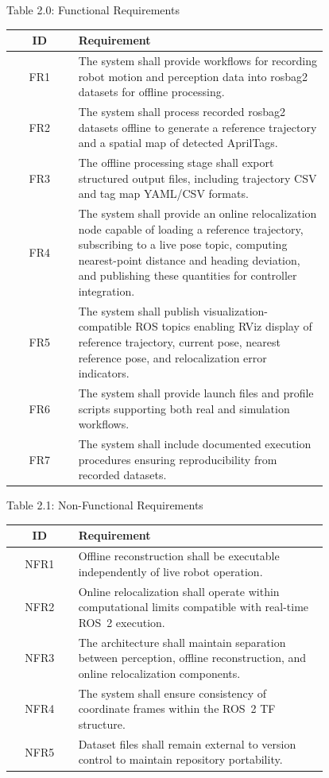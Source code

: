 \begin{frame}[label=appendix-table-20]{Table 2.0: Functional Requirements}
\scriptsize
\centering
\begin{tabular}{|c|p{0.79\linewidth}|}
\hline
\textbf{ID} & \textbf{Requirement} \\ \hline
FR1 & The system shall provide workflows for recording robot motion and perception data into rosbag2 datasets for offline processing. \\ \hline
FR2 & The system shall process recorded rosbag2 datasets offline to generate a reference trajectory and a spatial map of detected AprilTags. \\ \hline
FR3 & The offline processing stage shall export structured output files, including trajectory CSV and tag map YAML/CSV formats. \\ \hline
FR4 & The system shall provide an online relocalization node capable of loading a reference trajectory, subscribing to a live pose topic, computing nearest-point distance and heading deviation, and publishing these quantities for controller integration. \\ \hline
FR5 & The system shall publish visualization-compatible ROS topics enabling RViz display of reference trajectory, current pose, nearest reference pose, and relocalization error indicators. \\ \hline
FR6 & The system shall provide launch files and profile scripts supporting both real and simulation workflows. \\ \hline
FR7 & The system shall include documented execution procedures ensuring reproducibility from recorded datasets. \\ \hline
\end{tabular}
\end{frame}

\begin{frame}[label=appendix-table-21]{Table 2.1: Non-Functional Requirements}
\scriptsize
\centering
\begin{tabular}{|c|p{0.79\linewidth}|}
\hline
\textbf{ID} & \textbf{Requirement} \\ \hline
NFR1 & Offline reconstruction shall be executable independently of live robot operation. \\ \hline
NFR2 & Online relocalization shall operate within computational limits compatible with real-time ROS~2 execution. \\ \hline
NFR3 & The architecture shall maintain separation between perception, offline reconstruction, and online relocalization components. \\ \hline
NFR4 & The system shall ensure consistency of coordinate frames within the ROS~2 TF structure. \\ \hline
NFR5 & Dataset files shall remain external to version control to maintain repository portability. \\ \hline
\end{tabular}
\end{frame}

